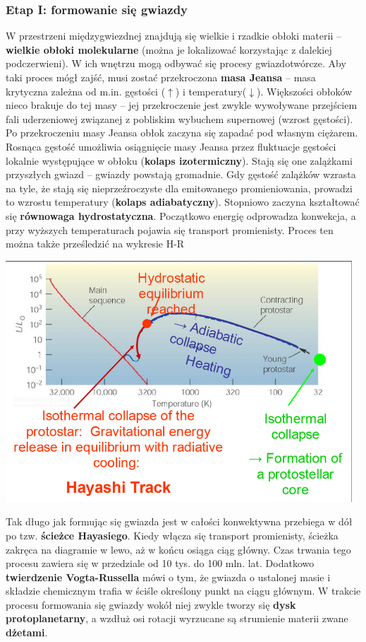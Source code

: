 \documentclass[../index.tex]{subfiles}
\begin{document}
            \subsubsection{Etap I: formowanie się gwiazdy}
                W przestrzeni międzygwiezdnej znajdują się wielkie i rzadkie obłoki materii – \textbf{wielkie obłoki molekularne} (można je lokalizować korzystając z dalekiej podczerwieni). W ich wnętrzu mogą odbywać się procesy gwiazdotwórcze. Aby taki proces mógł zajść, musi zostać przekroczona \textbf{masa Jeansa} – masa krytyczna zależna od m.in. gęstości (\(\uparrow\)) i temperatury(\(\downarrow\)). Większości obłoków nieco brakuje do tej masy – jej przekroczenie jest zwykle wywoływane przejściem fali uderzeniowej związanej z pobliskim wybuchem supernowej (wzrost gęstości). Po przekroczeniu masy Jeansa obłok zaczyna się zapadać pod własnym ciężarem. Rosnąca gęstość umożliwia osiągnięcie masy Jeansa przez fluktuacje gęstości lokalnie występujące w obłoku (\textbf{kolaps izotermiczny}). Stają się one zalążkami przyszłych gwiazd – gwiazdy powstają gromadnie. Gdy gęstość zalążków wzrasta na tyle, że stają się nieprzeźroczyste dla emitowanego promieniowania, prowadzi to wzrostu temperatury (\textbf{kolaps adiabatyczny}). Stopniowo zaczyna kształtować się \textbf{równowaga hydrostatyczna}. Początkowo energię odprowadza konwekcja, a przy wyższych temperaturach pojawia się transport promienisty. Proces ten można także prześledzić na wykresie H-R
                \begin{center}
                    \includegraphics[width=13cm]{images/ewolucjaGwiazdHR.png}
                \end{center}
                Tak długo jak formując się gwiazda jest w całości konwektywna przebiega w dół po tzw. \textbf{ścieżce Hayasiego}. Kiedy włącza się transport promienisty, ścieżka zakręca na diagramie w lewo, aż w końcu osiąga ciąg główny. Czas trwania tego procesu zawiera się w przedziale od 10 tys. do 100 mln. lat. Dodatkowo \textbf{twierdzenie Vogta-Russella} mówi o tym, że gwiazda o ustalonej masie i składzie chemicznym trafia w ściśle określony punkt na ciągu głównym. W trakcie procesu formowania się gwiazdy wokół niej zwykle tworzy się \textbf{dysk protoplanetarny}, a wzdłuż osi rotacji wyrzucane są strumienie materii zwane \textbf{dżetami}.
\end{document}

